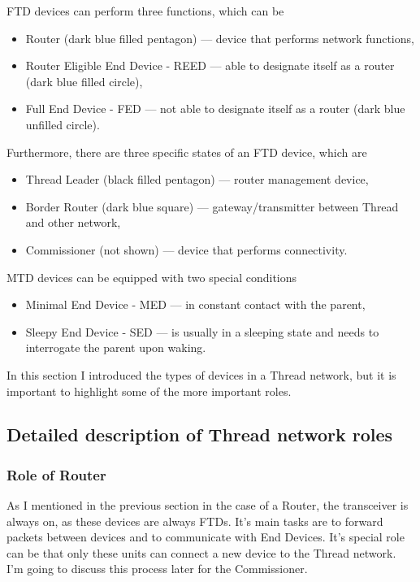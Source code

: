 \noindent
FTD devices can perform three functions, which can be\cite{OpenThreadNodeType}
\begin{itemize}
    \item Router (dark blue filled pentagon) --- device that performs network functions,
    \item Router Eligible End Device - REED --- able to designate itself as a router (dark blue filled circle),
    \item Full End Device - FED --- not able to designate itself as a router (dark blue unfilled circle).
\end{itemize}
\clearpage
\noindent
Furthermore, there are three specific states of an FTD device, which are 
\begin{itemize}
    \item Thread Leader (black filled pentagon) --- router management device,
    \item Border Router (dark blue square) --- gateway/transmitter between Thread and other network,
    \item Commissioner (not shown) --- device that performs connectivity.
\end{itemize}
MTD devices can be equipped with two special conditions
\begin{itemize}
    \item Minimal End Device - MED --- in constant contact with the parent,
    \item Sleepy End Device - SED --- is usually in a sleeping state and needs to interrogate the parent upon waking.
\end{itemize}
In this section I introduced the types of devices in a Thread network, but it is important to highlight some of the more important roles.


\subsection{Detailed description of Thread network roles}
\subsubsection{Role of Router}
As I mentioned in the previous section in the case of a Router, the transceiver is always on, as these devices are always FTDs. It's main tasks are to forward packets between devices and to communicate with End Devices. It's special role can be that only these units can connect a new device to the Thread network. I'm going to discuss this process later for the Commissioner.

